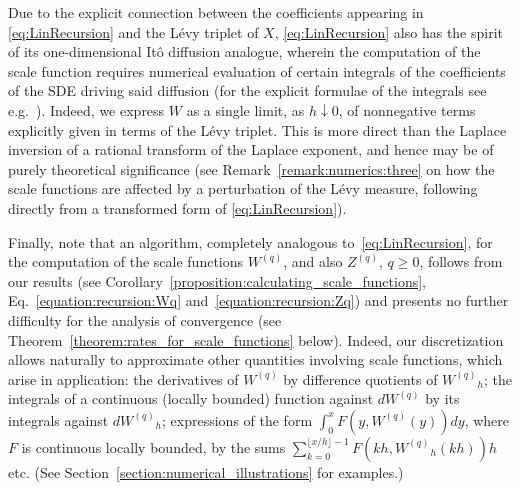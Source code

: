 \documentclass[pdftex,oneside,11pt,reqno]{amsart}
\theoremstyle{definition}
\theoremstyle{theorem}
\theoremstyle{remark}
\numberwithin{equation}{section}
\numberwithin{definition}{section}
\begin{document}
Due to the explicit connection between the coefficients appearing in \eqref{eq:LinRecursion} and the L\'evy triplet of $X$, \eqref{eq:LinRecursion} also has the spirit of its one-dimensional It\^o diffusion analogue, wherein the computation of the scale function requires numerical evaluation of certain integrals of the coefficients of the SDE driving said diffusion (for the explicit formulae of the integrals see e.g.~\cite[Chapters~2 and~3]{BorodinSalminen}). Indeed, we express ${W}$ as a single limit, as $h\downarrow 0$, of nonnegative terms explicitly given in terms of the L\'evy triplet. This is more direct than the Laplace inversion of a rational transform of the Laplace exponent, and hence may be of purely theoretical significance (see Remark~\ref{remark:numerics:three} on how the scale functions are affected by a perturbation of the L\'evy measure, following directly from a transformed form of \eqref{eq:LinRecursion}). 

Finally, note that an algorithm, completely analogous to~\eqref{eq:LinRecursion}, for the computation of the scale functions ${W^{(q)}}$, and also ${Z^{(q)}}$, $q\geq0$, follows from our results (see Corollary~\ref{proposition:calculating_scale_functions}, Eq.~\eqref{equation:recursion:Wq} and~\eqref{equation:recursion:Zq}) 
and presents no further difficulty for the analysis of convergence  (see Theorem~\ref{theorem:rates_for_scale_functions} below). Indeed, our discretization allows naturally to approximate other quantities involving scale functions, which arise in application: the derivatives of ${W^{(q)}}$ by difference quotients of ${W^{(q)}}_h$; the integrals of a continuous (locally bounded) function against $d{W^{(q)}}$ by its integrals against $d{W^{(q)}}_h$; expressions of the form $\int_0^xF(y,{W^{(q)}}(y))dy$, where $F$ is continuous locally bounded, by the sums $\sum_{k=0}^{\lfloor x/h\rfloor -1}F(kh,{W^{(q)}}_h(kh))h$ etc. (See Section~\ref{section:numerical_illustrations}  for examples.)  
\end{document}

